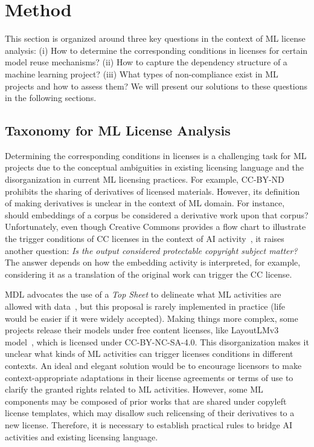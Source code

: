 \section{Method}
\label{sec:method}
This section is organized around three key questions in the context of ML license analysis: (i) How to determine the corresponding conditions in licenses for certain model reuse mechanisms? (ii) How to capture the dependency structure of a machine learning project? (iii) What types of non-compliance exist in ML projects and how to assess them?
We will present our solutions to these questions in the following sections.

\subsection{Taxonomy for ML License Analysis}
Determining the corresponding conditions in licenses is a challenging task for ML projects due to the conceptual ambiguities in existing licensing language and the disorganization in current ML licensing practices.
For example, CC-BY-ND prohibits the sharing of derivatives of licensed materials.
However, its definition of making derivatives is unclear in the context of ML domain.
For instance, should embeddings of a corpus be considered a derivative work upon that corpus?
Unfortunately, even though Creative Commons provides a flow chart to illustrate the trigger conditions of CC licenses in the context of AI activity~\cite{creative2023artificial}, it raises another question: \textit{Is the output considered protectable copyright subject matter?}
The answer depends on how the embedding activity is interpreted, for example, considering it as a translation of the original work can trigger the CC license.

MDL advocates the use of a \textit{Top Sheet} to delineate what ML activities are allowed with data~\cite{benjamin2019towards}, but this proposal is rarely implemented in practice (life would be easier if it were widely accepted). 
Making things more complex, some projects release their models under free content licenses, like LayoutLMv3 model~\cite{huang2022layoutlmv3}, which is licensed under CC-BY-NC-SA-4.0. 
This disorganization makes it unclear what kinds of ML activities can trigger licenses conditions in different contexts.
An ideal and elegant solution would be to encourage licensors to make context-appropriate adaptations in their license agreements or terms of use to clarify the granted rights related to ML activities. 
However, some ML components may be composed of prior works that are shared under copyleft license templates, which may disallow such relicensing of their derivatives to a new license.
Therefore, it is necessary to establish practical rules to bridge AI activities and existing licensing language.

